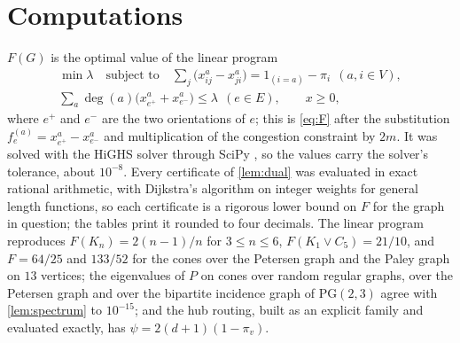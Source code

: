 \documentclass[11pt]{amsart}
\theoremstyle{definition}
\newcommand{\PG}{\mathrm{PG}}
\begin{document}
\section{Computations}\label{sec:comp}

$F(G)$ is the optimal value of the linear program
\begin{gather*}
\min\lambda\quad\text{subject to}\quad \sum_j\bigl(x^a_{ij}-x^a_{ji}\bigr)=1_{(i=a)}-\pi_i\ \ (a,i\in V),\\
\sum_a\deg(a)\bigl(x^a_{e^+}+x^a_{e^-}\bigr)\le\lambda\ \ (e\in E),\qquad x\ge0,
\end{gather*}
where $e^+$ and $e^-$ are the two orientations of $e$; this is \eqref{eq:F} after the substitution $f^{(a)}_e=x^a_{e^+}-x^a_{e^-}$ and multiplication of the congestion constraint by $2m$. It was solved with the HiGHS solver \cite{HiGHS} through SciPy \cite{SciPy}, so the values carry the solver's tolerance, about $10^{-8}$. Every certificate of \cref{lem:dual} was evaluated in exact rational arithmetic, with Dijkstra's algorithm on integer weights for general length functions, so each certificate is a rigorous lower bound on $F$ for the graph in question; the tables print it rounded to four decimals. The linear program reproduces $F(K_n)=2(n-1)/n$ for $3\le n\le6$, $F(K_1\vee C_5)=21/10$, and $F=64/25$ and $133/52$ for the cones over the Petersen graph and the Paley graph on $13$ vertices; the eigenvalues of $P$ on cones over random regular graphs, over the Petersen graph and over the bipartite incidence graph of $\PG(2,3)$ agree with \cref{lem:spectrum} to $10^{-15}$; and the hub routing, built as an explicit family and evaluated exactly, has $\psi=2(d+1)(1-\pi_v)$.
\end{document}
